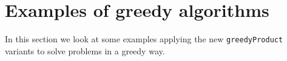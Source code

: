 \documentclass[runningheads]{llncs}
\begin{document}
%
%
%
%
%
%
\section{Examples of greedy algorithms}
\label{Greedy Examples}
In this section we look at some examples applying the new \texttt{greedyProduct} variants to solve problems in a greedy way. 
%
%
%
\end{document}
